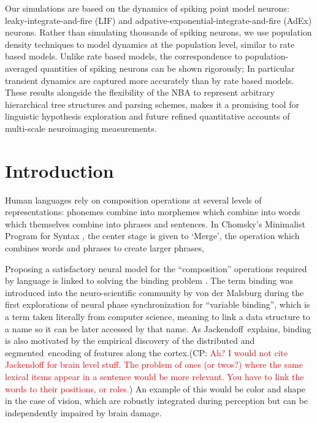 \documentclass[10pt]{article}
\newcommand{\noteCP}[1]{(CP: \textcolor{red}{#1})}
\begin{document}
Our simulations are based on the dynamics of spiking point model neurons: leaky-integrate-and-fire (LIF) and adpative-exponential-integrate-and-fire (AdEx) neurons.
Rather than simulating thousands of spiking neurons, we use population density techniques to model dynamics at the population level, similar to rate based models.
Unlike rate based models, the correspondence to population-averaged quantities of spiking neurons can be shown rigorously; 
In particular transient dynamics are captured more accurately than by rate based models.
These results alongside the flexibility of the NBA to represent arbitrary hierarchical tree structures and parsing schemes, makes it a promising tool for linguistic hypothesis exploration and future refined quantitative accounts of multi-scale neuroimaging measurements.


\section{Introduction}

{\label{931947}}

Human languages rely on composition operations at several levels of representations: phonemes combine into morphemes which combine into words which themselves combine into phrases and sentences.
In Chomsky's Minimalist Program for Syntax \cite{Chomsky_2013}, the center stage is given to `Merge', the operation which combines words and phrases to create larger phrases, 

Proposing a satisfactory neural model for the ``composition'' operations required by language is linked to solving the binding problem \cite{marcus14}.
The term binding was introduced into the neuro-scientific community by von der Malsburg\cite{von_der_Malsburg_1994} during the first explorations of neural phase synchronization for ``variable binding'', which is a term taken literally from computer science, meaning to link a data structure to a name so it can be later accessed by that name.
As Jackendoff\cite{Jackendoff_2002b}~explains, binding is also motivated by the empirical discovery of the distributed and segmented~encoding of features along the cortex.\noteCP{Ah? I would not cite Jackendoff for brain level stuff. The problem of ones (or twos?) where the same lexical items appear in a sentence would be more relevant. You have to link the words to their positions, or roles.}
An example of this would be color and shape in the case of vision, which are robustly integrated during perception but can be independently impaired by brain damage.
\end{document}
